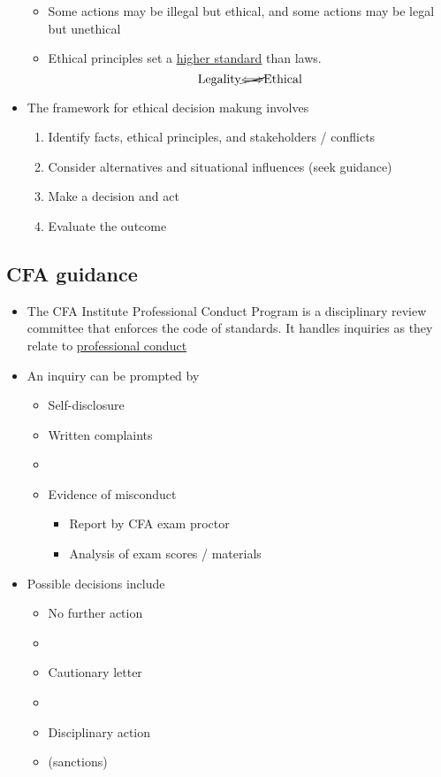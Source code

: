 \documentclass[../notes_compiled.tex]{subfiles}
\begin{document}
\begin{itemize}
\begin{itemize}
\item Some actions may be illegal but ethical, and some actions may be legal but unethical
\item[] Ethical principles set a \underline{higher standard} than laws.
\begin{equation*}
\text{Legality}\cancel\Longleftrightarrow\text{Ethical}
\end{equation*}
\end{itemize}
\item The framework for ethical decision makung involves
\begin{enumerate}
\item Identify facts, ethical principles, and stakeholders / conflicts
\item Consider alternatives and situational influences (seek guidance)
\item Make a decision and act
\item Evaluate the outcome
\end{enumerate}
\end{itemize}

\subsection{CFA guidance}
\begin{itemize}
\item The CFA Institute Professional Conduct Program is a disciplinary review committee that enforces the code of standards. It handles inquiries as they relate to \underline{professional conduct}
\item An inquiry can be prompted by
\begin{multicols}{2}
\begin{itemize}
\item Self-disclosure
\item Written complaints
\item[]
\item Evidence of misconduct
\begin{itemize}
\item Report by CFA exam proctor
\item Analysis of exam scores / materials
\end{itemize}
\end{itemize}
\end{multicols}
\item Possible decisions include
\begin{multicols}{3}
\begin{itemize}
\item No further action
\item[]
\item Cautionary letter
\item[]
\item Disciplinary action
\item[] (sanctions)
\end{itemize}
\end{multicols}
\end{itemize}
\end{document}
